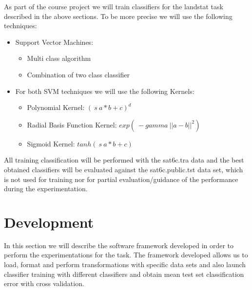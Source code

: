 \documentclass[a4paper,10pt,titlepage]{article}
\begin{document}
\par As part of the course project we will train classifiers for the landstat task described in the above sections. To be more precise we will use the following techniques:
\begin{itemize}
	\item Support Vector Machines:
		\begin{itemize}
			\item Multi class algorithm 
			\item Combination of two class classifier
		\end{itemize}
	\item For both SVM techniques we will use the following Kernels:
	\begin{itemize}
		\item Polynomial Kernel: \begin{math} (\ s\ a*b +c)^d\end{math}
		\item Radial Basis Function Kernel: \begin{math} exp(\ -gamma\ ||a-b||^2) \end{math}
		\item Sigmoid Kernel: \begin{math} tanh(\ s\ a*b + c) \end{math}		
	\end{itemize}
\end{itemize}

\par All training classification will be performed with the sat6c.tra data and the best obtained classifiers will be evaluated against the sat6c.public.tst data set, which is not used for training nor for partial evaluation/guidance of the performance during the experimentation. 

\section{Development}

\par In this section we will describe the software framework developed in order to perform the experimentations for the task. The framework developed allows us to load, format and perform transformations with specific data sets and also launch classifier training with different classifiers and obtain mean test set classification error with cross validation. 
\end{document}

